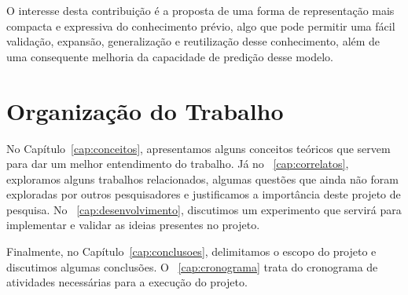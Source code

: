 O interesse desta contribuição é a proposta de uma forma de representação mais compacta e expressiva do conhecimento prévio, algo que pode permitir uma fácil validação, expansão, generalização e reutilização desse conhecimento, além de uma consequente melhoria da capacidade de predição desse modelo.

\section{Organização do Trabalho}
\label{sec:organizacao_trabalho}

No Capítulo~\ref{cap:conceitos}, apresentamos alguns conceitos teóricos que servem para dar um melhor entendimento do trabalho. Já no ~\ref{cap:correlatos}, exploramos alguns trabalhos relacionados, algumas questões que ainda não foram exploradas por outros pesquisadores e justificamos a importância deste projeto de pesquisa. No ~\ref{cap:desenvolvimento}, discutimos um experimento que servirá para implementar e validar as ideias presentes no projeto.

Finalmente, no Capítulo~\ref{cap:conclusoes}, delimitamos o escopo do projeto e discutimos algumas conclusões. O ~\ref{cap:cronograma} trata do cronograma de atividades necessárias para a execução do projeto.
